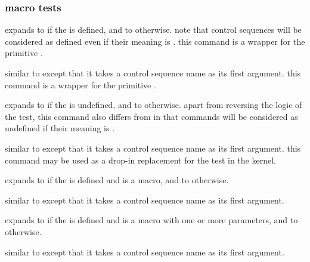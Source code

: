 \subsubsection{macro tests}
\label{aut:tst:def}

\begin{ltxsyntax}


expands to  if the  is defined, and to  otherwise. note that control sequences will be considered as defined even if their meaning is . this command is a \latex wrapper for the \etex primitive .


similar to  except that it takes a control sequence name as its first argument. this command is a \latex wrapper for the \etex primitive .


expands to  if the  is undefined, and to  otherwise. apart from reversing the logic of the test, this command also differs from  in that commands will be considered as undefined if their meaning is .


similar to  except that it takes a control sequence name as its first argument. this command may be used as a drop-in replacement for the  test in the \latex kernel.


expands to  if the  is defined and is a macro, and to  otherwise.


similar to  except that it takes a control sequence name as its first argument.


expands to  if the  is defined and is a macro with one or more parameters, and to  otherwise.


similar to  except that it takes a control sequence name as its first argument.


\end{ltxsyntax}
